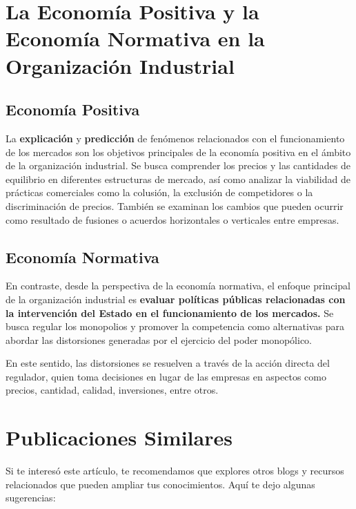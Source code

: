 \documentclass[
  doc,
  floatsintext,
  longtable,
  a4paper,
  nolmodern,
  notxfonts,
  notimes,
  colorlinks=true,linkcolor=blue,citecolor=blue,urlcolor=blue]{apa7}
\begin{document}
\section{La Economía Positiva y la Economía Normativa en la Organización
Industrial}\label{la-economuxeda-positiva-y-la-economuxeda-normativa-en-la-organizaciuxf3n-industrial}

\subsection{Economía Positiva}\label{economuxeda-positiva}

La \textbf{explicación} y \textbf{predicción} de fenómenos relacionados
con el funcionamiento de los mercados son los objetivos principales de
la economía positiva en el ámbito de la organización industrial. Se
busca comprender los precios y las cantidades de equilibrio en
diferentes estructuras de mercado, así como analizar la viabilidad de
prácticas comerciales como la colusión, la exclusión de competidores o
la discriminación de precios. También se examinan los cambios que pueden
ocurrir como resultado de fusiones o acuerdos horizontales o verticales
entre empresas.

\subsection{Economía Normativa}\label{economuxeda-normativa}

En contraste, desde la perspectiva de la economía normativa, el enfoque
principal de la organización industrial es \textbf{evaluar políticas
públicas relacionadas con la intervención del Estado en el
funcionamiento de los mercados.} Se busca regular los monopolios y
promover la competencia como alternativas para abordar las distorsiones
generadas por el ejercicio del poder monopólico.

En este sentido, las distorsiones se resuelven a través de la acción
directa del regulador, quien toma decisiones en lugar de las empresas en
aspectos como precios, cantidad, calidad, inversiones, entre otros.

\section{Publicaciones Similares}\label{publicaciones-similares}

Si te interesó este artículo, te recomendamos que explores otros blogs y
recursos relacionados que pueden ampliar tus conocimientos. Aquí te dejo
algunas sugerencias:
\end{document}
